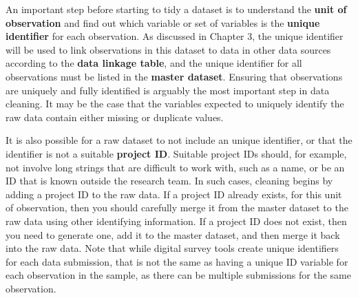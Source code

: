 An important step before starting to tidy a dataset is
to understand the \textbf{unit of observation}
and find out which variable or set of variables
is the \textbf{unique identifier} for each observation.
As discussed in Chapter 3,
the unique identifier will be used to link observations in this dataset
to data in other data sources according to the \textbf{data linkage table},
and the unique identifier for all observations
must be listed in the \textbf{master dataset}.
Ensuring that observations are uniquely and fully identified
is arguably the most important step in data cleaning.
It may be the case that the variables expected to uniquely identify
the raw data contain either missing or duplicate values.

It is also possible for a raw dataset to not include an unique identifier,
or that the identifier is not a suitable \textbf{project ID}.
Suitable project IDs should, for example, not involve long strings
that are difficult to work with, such as a name,
or be an ID that is known outside the research team.
In such cases, cleaning begins by
adding a project ID to the raw data.
If a project ID already exists,
for this unit of observation,
then you should carefully merge it
from the master dataset
to the raw data
using other identifying information.
If a project ID does not exist,
then you need to generate one,
add it to the master dataset,
and then merge it back into the raw data.
Note that while digital survey tools create
unique identifiers for each data submission,
that is not the same as having a unique ID variable
for each observation in the sample,
as there can be multiple submissions
for the same observation.

